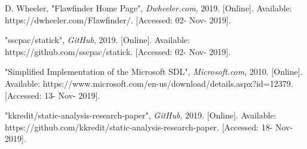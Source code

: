 \documentclass[journal]{IEEEtran}
\begin{document}
\begin{thebibliography}{00}

 D. Wheeler, "Flawfinder Home Page", \textit{Dwheeler.com}, 2019. [Online].
Available: https://dwheeler.com/Flawfinder/. [Accessed: 02- Nov- 2019].

 "sscpac/statick", \textit{GitHub}, 2019. [Online]. Available:
https://github.com/sscpac/statick. [Accessed: 02- Nov- 2019].

 "Simplified Implementation of the Microsoft SDL", \textit{Microsoft.com}, 2010.
[Online]. Available: https://www.microsoft.com/en-us/download/details.aspx?id=12379. [Accessed: 13-
Nov- 2019].

 "kkredit/static-analysis-research-paper", \textit{GitHub}, 2019. [Online].
Available: https://github.com/kkredit/static-analysis-research-paper. [Accessed: 18- Nov- 2019].

\end{thebibliography}
\end{document}

